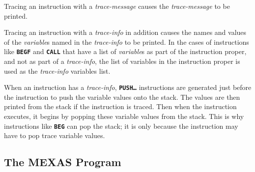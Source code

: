 \documentclass[12pt]{article}
\newcommand{\TT}[1]{{\tt \bfseries #1}}
\begin{document}
Tracing an instruction with a {\em trace-message} causes
the {\em trace-message} to be printed.

Tracing an instruction with a {\em trace-info} in addition causes
the names and values of the {\em variable}s named in the
{\em trace-info} to be printed.  In the cases of instructions
like \TT{BEGF} and \TT{CALL} that have a list of {\em variable}s
as part of the instruction proper, and not as part of a
{\em trace-info}, the list of variables in the instruction proper
is used as the {\em trace-info} variables list.

When an instruction has a {\em trace-info}, \TT{PUSH\ldots}
instructions are generated just before the instruction to
push the variable values onto the stack.  The values are then
printed from the stack if the instruction is traced.  Then
when the instruction executes, it begins by popping these
variable values from the stack.  This is why instructions
like \TT{BEG} can pop the stack; it is only because the
instruction may have to pop trace variable values.


\subsection{The MEXAS Program}
\label{THE-MEXAS-PROGRAM}


\clearpage

\printindex
\end{document}
